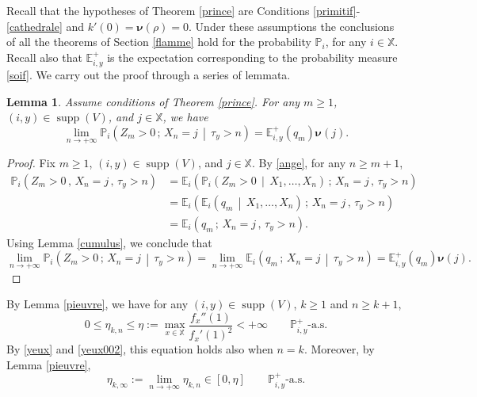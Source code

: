\documentclass[12pt]{amsart}
\newtheorem{lemma}[theorem]{Lemma}
\theoremstyle{definition}
\numberwithin{equation}{section}
\newcommand*{\sachant}[2]{\left.#1 \,\middle|\,#2\right.}
\def\bb#1{\mathbb{#1}}
\def\bs#1{\boldsymbol{#1}}
\def\geq{\geqslant}
\def\leq{\leqslant}
\DeclareMathOperator{\supp}{supp}
\begin{document}
Recall that the hypotheses of Theorem \ref{prince} are Conditions \ref{primitif}-\ref{cathedrale} and $k'(0)=\bs \nu(\rho)=0$. Under these assumptions the conclusions of all the theorems of 
Section \ref{flamme} hold for the probability $\bb P_i$, for any $i \in \bb X$. 
Recall also that $\bb E_{i,y}^+$ is the expectation corresponding to the probability measure \eqref{soif}.
We carry out the proof through a series of lemmata. 

\begin{lemma}
Assume conditions of Theorem \ref{prince}.
\label{nuage}
For any $m\geq 1$, $(i,y) \in \supp(V)$, and $j \in \bb X$, we have
\[
\lim_{n\to +\infty} \bb P_i \left( \sachant{Z_m > 0 \,;\, X_n = j}{ \tau_y > n } \right) = \bb E_{i,y}^+ \left( q_m \right) \bs \nu (j).
\]
\end{lemma}

\begin{proof}
Fix $m \geq 1$, $(i,y) \in \supp(V)$, and $j \in \bb X$. By \eqref{ange}, for any $n \geq m+1$,
\begin{align*}
\bb P_i \left( Z_m > 0 \,,\, X_n = j \,,\, \tau_y > n \right) &= \bb E_i \left( \bb P_i \left( \sachant{Z_m > 0}{ X_1, \dots, X_n } \right) \,;\, X_n = j \,,\, \tau_y > n \right) \\
&= \bb E_i \left( \bb E_i \left( \sachant{q_m}{ X_1, \dots, X_n } \right) \,;\, X_n = j \,,\, \tau_y > n  \right) \\
&= \bb E_i \left( q_m \,;\, X_n = j \,,\, \tau_y > n \right).
\end{align*}
Using Lemma \ref{cumulus}, we conclude that
\[
\lim_{n\to +\infty} \bb P_i \left( \sachant{Z_m > 0 \,;\, X_n = j}{ \tau_y > n } \right) = \lim_{n\to +\infty} \bb E_i \left( \sachant{q_m \,;\, X_n = j }{ \tau_y > n } \right) = \bb E_{i,y}^+ \left( q_m \right) \bs \nu(j).
\]
\end{proof}

By Lemma \ref{pieuvre}, we have for any $(i,y) \in \supp(V)$, $k \geq 1$ and $n \geq k+1$,
\begin{equation}
	\label{aquarium}
	0 \leq \eta_{k,n} \leq \eta := \max_{x \in \bb X} \frac{f_x''(1)}{f_x'(1)^2} < +\infty \qquad \bb P_{i,y}^+\text{-a.s.}
\end{equation}
By \eqref{yeux} and \eqref{yeux002}, this equation holds also when $n=k$. Moreover, by Lemma \ref{pieuvre},
\begin{equation}
	\label{poissonBP}
	\eta_{k,\infty} := \lim_{n\to+\infty} \eta_{k,n}  \in [0,\eta] \qquad \bb P_{i,y}^+\text{-a.s.}
\end{equation}
\end{document}
